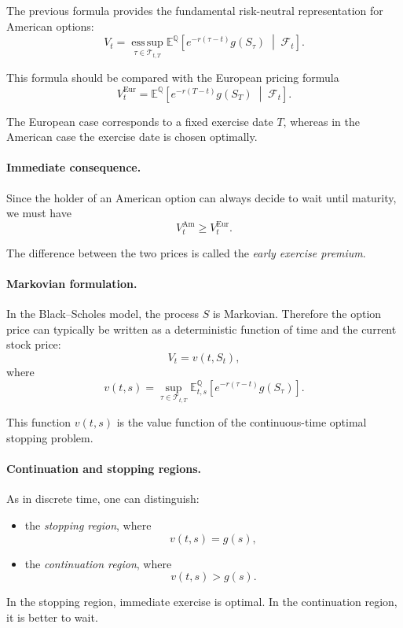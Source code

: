 \documentclass[11pt]{article}
\newcommand{\Qbb}{\mathbb{Q}}
\newcommand{\E}{\mathbb{E}}
\theoremstyle{definition}
\theoremstyle{plain}
\begin{document}
The previous formula provides the fundamental risk-neutral representation
for American options:
\[
\boxed{
V_t
=
\operatorname*{ess\,sup}_{\tau\in\mathcal{T}_{t,T}}
\E^{\Qbb}\!\left[
e^{-r(\tau-t)} g(S_\tau)
\;\middle|\;
\mathcal{F}_t
\right].
}
\]

This formula should be compared with the European pricing formula
\[
V_t^{\mathrm{Eur}}
=
\E^{\Qbb}\!\left[
e^{-r(T-t)} g(S_T)
\;\middle|\;
\mathcal{F}_t
\right].
\]

The European case corresponds to a fixed exercise date \(T\),
whereas in the American case the exercise date is chosen optimally.

\paragraph{Immediate consequence.}
Since the holder of an American option can always decide to wait until
maturity, we must have
\[
V_t^{\mathrm{Am}} \ge V_t^{\mathrm{Eur}}.
\]

The difference between the two prices is called the
\emph{early exercise premium}.

\paragraph{Markovian formulation.}
In the Black--Scholes model, the process \(S\) is Markovian.
Therefore the option price can typically be written as a deterministic
function of time and the current stock price:
\[
V_t = v(t,S_t),
\]
where
\[
v(t,s)
=
\sup_{\tau\in\mathcal{T}_{t,T}}
\E^{\Qbb}_{t,s}\!\left[
e^{-r(\tau-t)} g(S_\tau)
\right].
\]

This function \(v(t,s)\) is the value function of the continuous-time
optimal stopping problem.

\paragraph{Continuation and stopping regions.}
As in discrete time, one can distinguish:
\begin{itemize}[leftmargin=1.4em]
    \item the \emph{stopping region}, where
    \[
    v(t,s)=g(s),
    \]
    \item the \emph{continuation region}, where
    \[
    v(t,s)>g(s).
    \]
\end{itemize}

In the stopping region, immediate exercise is optimal.
In the continuation region, it is better to wait.
\end{document}
